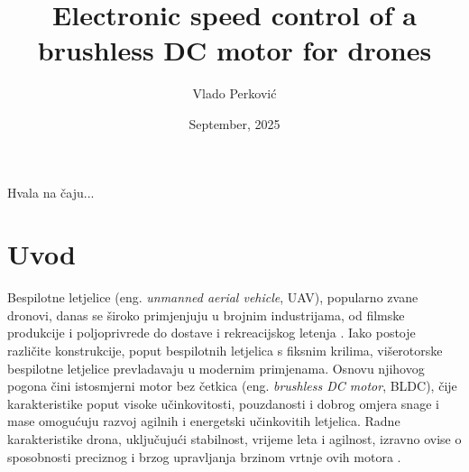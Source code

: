 \documentclass[diplomskirad]{fer}
\title{Electronic speed control of a brushless DC motor for drones}
\author{Vlado Perković}
\date{September, 2025}
\begin{document}
\maketitle




\begin{zahvale}
	Hvala na čaju...
\end{zahvale}

\mainmatter

\tableofcontents
\newpage

\chapter{Uvod}
\label{pog:uvod}

Bespilotne letjelice (eng. \textit{unmanned aerial vehicle}, UAV), popularno
zvane dronovi, danas se široko primjenjuju u brojnim industrijama, od filmske
produkcije i poljoprivrede do dostave i rekreacijskog letenja
\cite{cite:primjena}. Iako postoje različite konstrukcije, poput bespilotnih
letjelica s fiksnim krilima, višerotorske bespilotne letjelice prevladavaju u
modernim primjenama. Osnovu njihovog pogona čini istosmjerni motor bez četkica
(eng. \textit{brushless DC motor}, BLDC), čije karakteristike poput visoke
učinkovitosti, pouzdanosti i dobrog omjera snage i mase omogućuju razvoj
agilnih i energetski učinkovitih letjelica. Radne karakteristike drona,
uključujući stabilnost, vrijeme leta i agilnost, izravno ovise o sposobnosti
preciznog i brzog upravljanja brzinom vrtnje ovih motora
\cite{cite:karakteristike_motora}.

\end{document}
